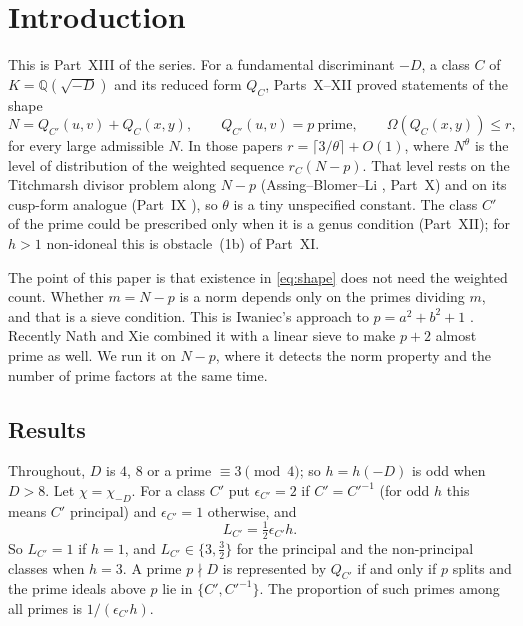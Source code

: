 \documentclass[11pt]{amsart}
\theoremstyle{remark}
\newcommand{\Q}{\mathbb Q}
\begin{document}
\section{Introduction}
This is Part~XIII of the series. For a fundamental discriminant $-D$, a class $C$ of $K=\Q(\sqrt{-D})$ and its reduced form $Q_C$, Parts~X--XII \cite{ChenX,ChenXI,ChenXII} proved statements of the shape
\begin{equation}\label{eq:shape}
N=Q_{C'}(u,v)+Q_C(x,y),\qquad Q_{C'}(u,v)=p\ \text{prime},\qquad \Omega(Q_C(x,y))\le r,
\end{equation}
for every large admissible $N$. In those papers $r=\lceil3/\theta\rceil+O(1)$, where $N^{\theta}$ is the level of distribution of the weighted sequence $r_C(N-p)$. That level rests on the Titchmarsh divisor problem along $N-p$ (Assing--Blomer--Li \cite{ABL}, Part~X) and on its cusp-form analogue (Part~IX \cite{ChenIX}), so $\theta$ is a tiny unspecified constant. The class $C'$ of the prime could be prescribed only when it is a genus condition (Part~XII); for $h>1$ non-idoneal this is obstacle~(1b) of Part~XI.

The point of this paper is that existence in \eqref{eq:shape} does not need the weighted count. Whether $m=N-p$ is a norm depends only on the primes dividing $m$, and that is a sieve condition. This is Iwaniec's approach to $p=a^2+b^2+1$ \cite{Iw72,Iw76}. Recently Nath and Xie \cite{NX} combined it with a linear sieve to make $p+2$ almost prime as well. We run it on $N-p$, where it detects the norm property and the number of prime factors at the same time.

\subsection*{Results}
Throughout, $D$ is $4$, $8$ or a prime $\equiv3\pmod4$; so $h=h(-D)$ is odd when $D>8$. Let $\chi=\chi_{-D}$. For a class $C'$ put $\epsilon_{C'}=2$ if $C'=C'^{-1}$ (for odd $h$ this means $C'$ principal) and $\epsilon_{C'}=1$ otherwise, and
\[
L_{C'}=\tfrac12\epsilon_{C'}h .
\]
So $L_{C'}=1$ if $h=1$, and $L_{C'}\in\{3,\frac32\}$ for the principal and the non-principal classes when $h=3$. A prime $p\nmid D$ is represented by $Q_{C'}$ if and only if $p$ splits and the prime ideals above $p$ lie in $\{C',C'^{-1}\}$. The proportion of such primes among all primes is $1/(\epsilon_{C'}h)$.
\end{document}
